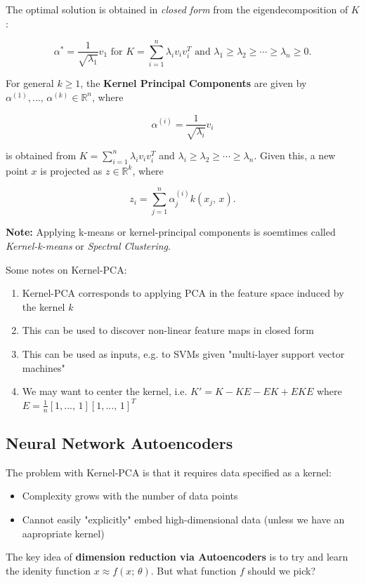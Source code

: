 \documentclass[a4paper]{extarticle}
\begin{document}
The optimal solution is obtained in \textit{closed form} from the eigendecomposition of $K$:

\[
    \alpha^* = \frac{1}{\sqrt{\lambda_1}}v_1 \text{ for } K = \sum_{i = 1}^n \lambda_iv_iv_i^T \text{ and } \lambda_1 \geq \lambda_2 \geq \cdots \geq  \lambda_n \geq 0.
\]

For general $k \geq 1$, the \textbf{Kernel Principal Components} are given by $\alpha^{(1)},..., \, \alpha^{(k)} \in \mathbb{R}^n$, where

\[
    \alpha^{(i)} = \frac{1}{\sqrt{\lambda_i}}v_i
\]

is obtained from $K = \sum_{i = 1}^n \lambda_i v_i v_i^T$ and $\lambda_i \geq \lambda_2 \geq \cdots \geq \lambda_n$. Given this, a new point $x$ is projected as $z \in \mathbb{R}^k$, where

\[
    z_i = \sum_{j = 1}^n \alpha_j^{(i)}k(x_j, \, x).
\]

\textbf{Note:} Applying k-means or kernel-principal components is soemtimes called \textit{Kernel-k-means} or \textit{Spectral Clustering}.

Some notes on Kernel-PCA:
\begin{enumerate}
    \item Kernel-PCA corresponds to applying PCA in the feature space induced by the kernel $k$
    \item This can be used to discover non-linear feature maps in closed form
    \item This can be used as inputs, e.g. to SVMs given "multi-layer support vector machines"
    \item We may want to center the kernel, i.e. $K' = K - KE - EK + EKE$ where $E = \frac{1}{n}[1,..., \, 1][1,..., \, 1]^T$
\end{enumerate}

\subsection{Neural Network Autoencoders}

The problem with Kernel-PCA is that it requires data specified as a kernel:
\begin{itemize}
    \item Complexity grows with the number of data points
    \item Cannot easily "explicitly" embed high-dimensional data (unless we have an aapropriate kernel)
\end{itemize}

The key idea of \textbf{dimension reduction via Autoencoders} is to try and learn the idenity function $x \approx f(x; \, \theta)$. But what function $f$ should we pick?
\end{document}
